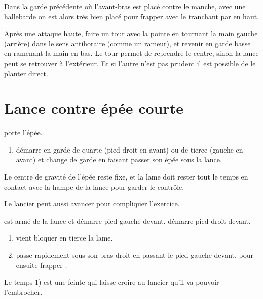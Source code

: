 Dans la garde précédente où l'avant-bras est placé contre le manche, avec une hallebarde on est alors très bien placé pour frapper avec le tranchant par en haut.


\begin{technique}
Après une attaque haute, faire un tour avec la pointe en tournant la main gauche (arrière) dans le sens antihoraire (comme un rameur), et revenir en garde basse en ramenant la main en bas.
Le tour permet de reprendre le centre, sinon la lance peut se retrouver à l'extérieur.
Et si l'autre n'est pas prudent il est possible de le planter direct.
\end{technique}


\section{Lance contre épée courte}


\begin{exercice}

\A porte l'épée.

\begin{enumerate}
	\item \A démarre en garde de quarte (pied droit en avant) ou de tierce (gauche en avant) et change de garde en faisant passer son épée sous la lance.
\end{enumerate}

Le centre de gravité de l'épée reste fixe, et la lame doit rester tout le temps en contact avec la hampe de la lance pour garder le contrôle.

Le lancier peut aussi avancer pour compliquer l'exercice.
\end{exercice}


\begin{technique}

\D est armé de la lance et démarre pied gauche devant.
\A démarre pied droit devant.

\begin{enumerate}
	\item \A vient bloquer en tierce la lame.
	
	\item \A passe rapidement sous son bras droit en passant le pied gauche devant, pour ensuite frapper \D.
\end{enumerate}

Le temps 1) est une feinte qui laisse croire au lancier qu'il va pouvoir l'embrocher.
\end{technique}


